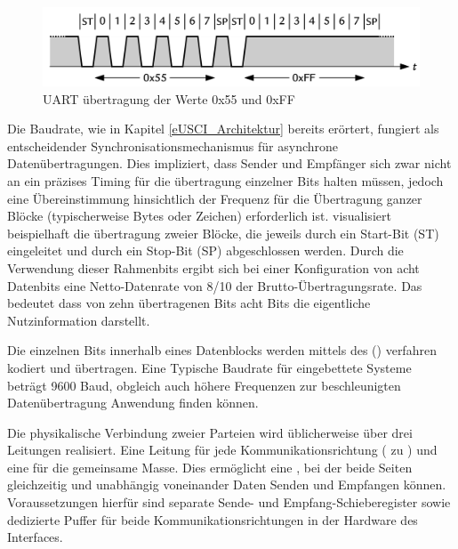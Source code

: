 \begin{figure}[h!]
	\centering
	\includegraphics[width=1.0\textwidth]{../Bilder/Baudrate.png}
	\caption{UART \"ubertragung der Werte 0x55 und 0xFF\\}
	\label{fig:Baudrate}
\end{figure}

Die Baudrate, wie in Kapitel \ref{eUSCI_Architektur} bereits er\"ortert, fungiert als entscheidender Synchronisationsmechanismus f\"ur asynchrone Daten\"ubertragungen. Dies impliziert, dass Sender und Empf\"anger sich zwar nicht an ein pr\"azises Timing f\"ur die \"ubertragung einzelner Bits halten m\"ussen, jedoch eine \"Ubereinstimmung hinsichtlich der Frequenz f\"ur die \"Ubertragung ganzer Bl\"ocke (typischerweise Bytes oder Zeichen) erforderlich ist.  visualisiert beispielhaft die \"ubertragung zweier Bl\"ocke, die jeweils durch ein Start-Bit (ST) eingeleitet und durch ein Stop-Bit (SP) abgeschlossen werden. Durch die Verwendung dieser Rahmenbits ergibt sich bei einer Konfiguration von acht Datenbits eine Netto-Datenrate von 8/10 der Brutto-\"Ubertragungsrate. Das bedeutet dass von zehn \"ubertragenen Bits acht Bits die eigentliche Nutzinformation darstellt.

Die einzelnen Bits innerhalb eines Datenblocks werden mittels des  () verfahren kodiert und \"ubertragen. Eine Typische Baudrate f\"ur eingebettete Systeme betr\"agt 9600 Baud, obgleich auch h\"ohere Frequenzen zur beschleunigten Daten\"ubertragung Anwendung finden k\"onnen.

Die physikalische Verbindung zweier Parteien wird \"ublicherweise \"uber drei Leitungen realisiert. Eine Leitung f\"ur jede Kommunikationsrichtung ( zu ) und eine f\"ur die gemeinsame Masse. Dies erm\"oglicht eine , bei der beide Seiten gleichzeitig und unabh\"angig voneinander Daten Senden und Empfangen k\"onnen. Voraussetzungen hierf\"ur sind separate Sende- und Empfang-Schieberegister sowie dedizierte Puffer f\"ur beide Kommunikationsrichtungen in der Hardware des Interfaces.

